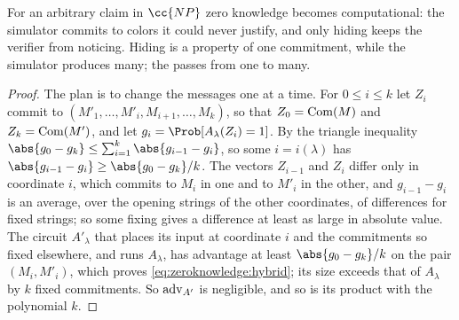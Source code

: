 \begin{refsection}
For an arbitrary claim in $\cc{NP}$ zero knowledge becomes computational: the simulator commits to colors it could never justify, and only hiding keeps the verifier from noticing. Hiding is a property of one commitment, while the simulator produces many; the  passes from one to many.


\begin{proof}
The plan is to change the messages one at a time. For $0\le i\le k$ let $Z_i$ commit to $(M'_1,\dots,M'_i,M_{i+1},\dots,M_k)$, so that $Z_0=\mathrm{Com}(M)$ and $Z_k=\mathrm{Com}(M')$, and let $g_i=\Prob[A_\lambda(Z_i)=1]$. By the triangle inequality $\abs{g_0-g_k}\le\sum_{i=1}^k\abs{g_{i-1}-g_i}$, so some $i=i(\lambda)$ has $\abs{g_{i-1}-g_i}\ge\abs{g_0-g_k}/k$. The vectors $Z_{i-1}$ and $Z_i$ differ only in coordinate $i$, which commits to $M_i$ in one and to $M'_i$ in the other, and $g_{i-1}-g_i$ is an average, over the opening strings of the other coordinates, of differences for fixed strings; so some fixing gives a difference at least as large in absolute value. The circuit $A'_\lambda$ that places its input at coordinate $i$ and the commitments so fixed elsewhere, and runs $A_\lambda$, has advantage at least $\abs{g_0-g_k}/k$ on the pair $(M_i,M'_i)$, which proves \eqref{eq:zeroknowledge:hybrid}; its size exceeds that of $A_\lambda$ by $k$ fixed commitments. So $\mathrm{adv}_{A'}$ is negligible, and so is its product with the polynomial $k$.
\end{proof}


\end{refsection}
